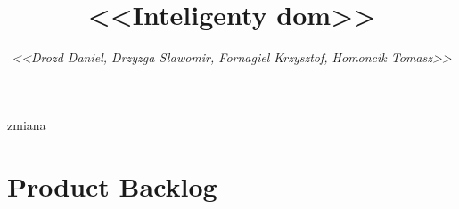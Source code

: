 \documentclass[a4paper,12pt]{article}
\title{\bf{<<Inteligenty dom>>}}
\author{{\em <<Drozd Daniel, Drzyzga Sławomir, Fornagiel Krzysztof, Homoncik Tomasz>>}}
\date{}
\begin{document}
	zmiana
	
	\tableofcontents
	\thispagestyle{empty}
	
	
	
	\section{Product Backlog}
	
		

	
	
	
	
\end{document}

